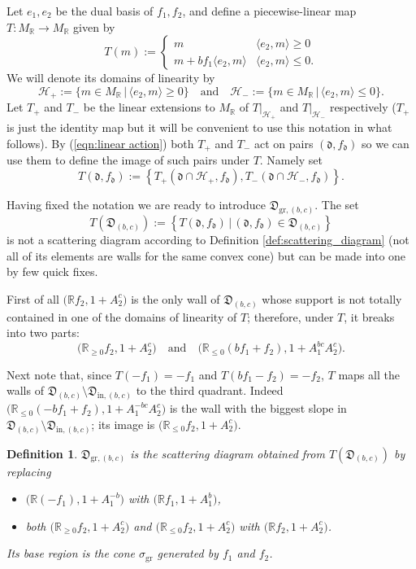 \documentclass[11pt]{amsart}
\newtheorem{defn}[theorem]{Definition}
\theoremstyle{remark}
\numberwithin{equation}{section}
\newcommand{\RR}{\mathbb{R}}
\newcommand{\dd}{\mathfrak{d}}
\newcommand{\DD}{\mathfrak{D}}
\newcommand{\gr}{\mathrm{gr}}
\begin{document}
Let $e_1,e_2$ be the dual basis of $f_1, f_2$, and define a piecewise-linear map
$T:M_\RR\rightarrow M_\RR$ given by
\[
  T (m) := 
  \begin{cases}
    m   & \langle e_2 , m \rangle \geq 0 \\
    m + b f_1 \langle e_2, m \rangle & \langle e_2, m \rangle \leq 0.
  \end{cases}
\]
We will denote its domains of linearity by 
\[ 
  \mathcal{H}_{+} := 
  \{ m \in M_{\mathbb{R}}\, |\, \langle e_2 , m \rangle \geq 0 \} 
  \quad
  \mbox{and}
  \quad
  \mathcal{H}_{-} := 
  \{ m \in M_{\mathbb{R}} \,|\, \langle e_2 , m \rangle \leq 0 \}.
\]
Let $T_+$ and $T_-$ be the linear extensions to $M_\RR$ of $T|_{\mathcal{H}_+}$
and $T|_{\mathcal{H}_-}$ respectively ($T_+$ is just the identity map but it
will be convenient to use this notation in what follows). 
By (\ref{eqn:linear action}) both $T_+$ and $T_-$ act on pairs $(\dd,f_\dd)$ so
we can use them to define the image of such pairs under $T$. Namely set
\[
  T(\dd,f_\dd):=
  \left\{
    T_+\left(\dd\cap\mathcal{H}_+,f_\dd\right),
    T_-\left(\dd\cap\mathcal{H}_-,f_\dd\right)
  \right\}.
\]

Having fixed the notation we are ready to introduce $\DD_{\mathrm{gr},(b,c)}$.
The set
\[
  T(\DD_{(b,c)}):=
  \left\{
    T(\dd,f_\dd)\, |\, (\dd,f_\dd)\in \DD_{(b,c)}
  \right\}
\]
is not a scattering diagram according to Definition 
\ref{def:scattering_diagram} (not all of its elements are walls for the same
convex cone) but can be made into one by few quick fixes.

First of all $\big( \RR f_2, 1+A_2^c\big)$ is the only wall of $\DD_{(b,c)}$
whose support is not totally contained in one of the domains of linearity of
$T$; therefore, under $T$, it breaks into two parts:
\[
  \big( \RR_{\ge0} f_2, 1+A_2^c\big)
  \quad
  \mbox{and}
  \quad
  \big( \RR_{\le 0} (bf_1+f_2), 1+A_1^{bc}A_2^c\big).
\]

Next note that, since $T(-f_1)=-f_1$ and $T(bf_1-f_2)=-f_2$, $T$ maps all the
walls of $\DD_{(b,c)}\setminus\DD_{\mathrm{in},(b,c)}$ to the third quadrant. 
Indeed $\big(\RR_{\leq0}(-bf_1+f_2),1+A_1^{-bc}A_2^c\big)$ is the wall with the
biggest slope in $\DD_{(b,c)}\setminus\DD_{\mathrm{in},(b,c)}$; its image is
$\big( \RR_{\le0} f_2, 1+A_2^c\big)$.

\begin{defn}
  $\DD_{\gr,(b,c)}$ is the scattering diagram obtained from
  $T(\DD_{(b,c)})$ by replacing 
  \begin{itemize}
    \item
      $\big(\RR (-f_1), 1+A_1^{-b}\big)$ with $\big(\RR  f_1, 1+A_1^b\big)$,
    
    \item 
      both $ \big( \RR_{\ge0} f_2, 1+A_2^c\big)$ and $\big( \RR_{\le0} f_2,
      1+A_2^c\big)$ with $ \big( \RR f_2, 1+A_2^c\big)$.
  \end{itemize}
  Its base region is the cone $\sigma_\gr$ generated by $f_1$ and $f_2$.
\end{defn}
\end{document}
